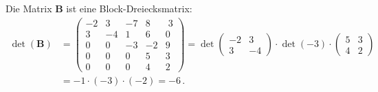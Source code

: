 {%
Die Matrix $\boldsymbol B$ ist eine Block-Dreiecksmatrix:
\begin{align*} \det(\boldsymbol B) &= \begin{pmatrix}
-2 & 3 & -7 & 8 & \;3 \\ 
3 & -4 & 1 & 6 & 0 \\ 
0 & 0 & -3 & -2 & 9 \\ 
0 & 0 & 0 & 5 & 3 \\ 
0 & 0 & 0 & 4 & 2\end{pmatrix}
= \det \begin{pmatrix}-2 & 3\\ 3 & -4\end{pmatrix} \cdot \det(-3) \cdot
\begin{pmatrix} 5 & 3 \\ 4 & 2\end{pmatrix}\\[2ex]
& = -1 \cdot (-3)\cdot (-2) = -6\,.
\end{align*}

}
